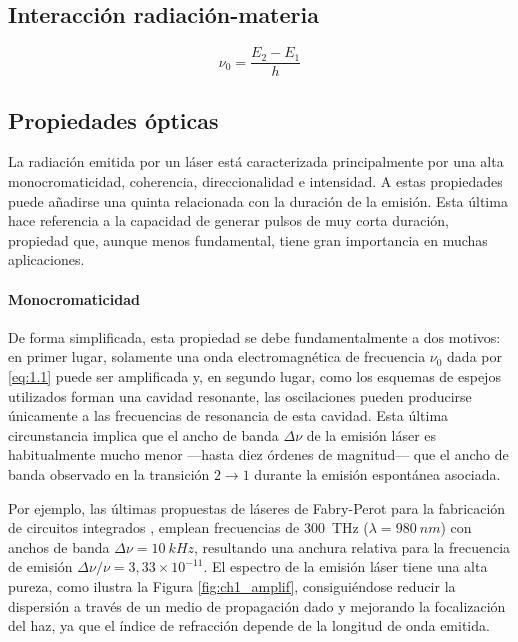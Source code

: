 \subsection{Interacción radiación-materia}\label{sec:1.1.1}

\begin{equation}\label{eq:1.1}
  \nu_{0} = \frac{E_{2}-E_{1}}{h}
\end{equation}

\subsection{Propiedades ópticas}\label{sec:1.1.2}
La radiación emitida por un láser está caracterizada principalmente por una alta monocromaticidad, coherencia, direccionalidad e intensidad. A estas propiedades puede añadirse una quinta relacionada con la duración de la emisión\autocite{sveltoPrinciplesLasers2010}. Esta última hace referencia a la capacidad de generar pulsos de muy corta duración, propiedad que, aunque menos fundamental, tiene gran importancia en muchas aplicaciones. 

\paragraph{Monocromaticidad}\label{par:1.1.2.1}
De forma simplificada, esta propiedad se debe fundamentalmente a dos motivos: en primer lugar, solamente una onda electromagnética de frecuencia $\nu_0$ dada por \eqref{eq:1.1} puede ser amplificada y, en segundo lugar, como los esquemas de espejos utilizados forman una cavidad resonante, las oscilaciones pueden producirse únicamente a las frecuencias de resonancia de esta cavidad. Esta última circunstancia implica que el ancho de banda $\Delta\nu$ de la emisión láser es habitualmente mucho menor ---hasta diez órdenes de magnitud--- que el ancho de banda observado en la transición $2\rightarrow 1$ durante la emisión espontánea asociada.

Por ejemplo, las últimas propuestas de láseres de Fabry-Perot para la fabricación de circuitos integrados \autocite{tranExtendingSpectrumFully2022}, emplean frecuencias de \qty{300}{THz} ($\lambda = \qty{980}{nm}$) con anchos de banda $\Delta\nu = \qty{10}{kHz}$, resultando una anchura relativa para la frecuencia de emisión $\Delta\nu/\nu = 3,33\times 10^{-11}$. El espectro de la emisión láser tiene una alta pureza, como ilustra la Figura \ref{fig:ch1_amplif}, consiguiéndose reducir la dispersión a través de un medio de propagación dado y mejorando la focalización del haz, ya que el índice de refracción depende de la longitud de onda emitida.

